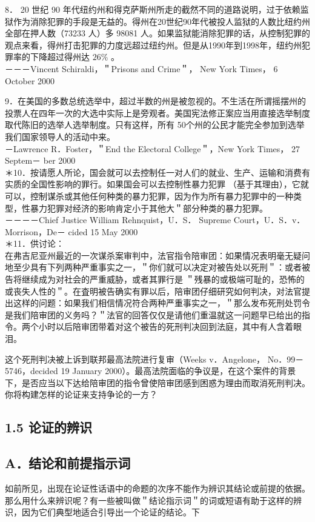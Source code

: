 8． 20 世纪 90 年代纽约州和得克萨斯州所走的截然不同的道路说明，过于依赖监狱作为消除犯罪的手段是无益的。得州在20世纪90年代被投人监狱的人数比纽约州全部在押人数（73233 人）多 98081 人。如果监狱能消除犯罪的话，从控制犯罪的观点来看，得州打击犯罪的力度远超过纽约州。但是从1990年到1998年，纽约州犯罪率的下降超过得州达 $26 \%$ 。\\
－－－Vincent Schiraldi，＂Prisons and Crime＂， New York Times， 6 October 2000

9．在美国的多数总统选举中，超过半数的州是被忽视的。不生活在所谓摇摆州的投票人在四年一次的大选中实际上是旁观者。美国宪法修正案应当用直接选举制度取代陈旧的选举人选举制度。只有这样，所有 50个州的公民才能完全参加到选举我们国家领导人的活动中来。\\
－Lawrence R．Foster，＂End the Electoral College＂，New York Times， 27 Septem－ ber 2000\\
＊10．按请愿人所论，国会就可以去控制任一对人们的就业、生产、运输和消费有实质的全国性影响的罪行。如果国会可以去控制性暴力犯罪 （基于其理由），它就可以，控制谋杀或其他任何种类的暴力犯罪，因为作为所有暴力犯罪中的一种类型，性暴力犯罪对经济的影响肯定小于其他大＂部分种类的暴力犯罪。\\
－－－－Chief Justice William Rehnquist，U．S． Supreme Court，U．S．v．Morrison，De－ cided 15 May 2000\\
＊11．供讨论：\\
在弗吉尼亚州最近的一次谋杀案审判中，法官指令陪审团：如果情况表明毫无疑问地至少具有下列两种严重事实之一，＂你们就可以决定对被告处以死刑＂：或者被告将继续成为对社会的严重威胁，或者其罪行是 ＂残暴的或极端可耻的，恐怖的或丧失人性的＂。在査明被告确实有罪以后，陪审团仔细研究如何判决，对法官提出这样的问题：如果我们相信情况符合两种严重事实之一，＂那么发布死刑处罚令是我们陪审团的义务吗？＂法官的回答仅仅是请他们重温就这一问题早已给出的指令。两个小时以后陪审团带着对这个被告的死刑判决回到法庭，其中有人含着眼泪。

这个死刑判决被上诉到联邦最高法院进行复审（Weeks v．Angelone， No．99－5746，decided 19 January 2000）。最高法院面临的争议是，在这个案件的背景下，是否应当以下达给陪审团的指令曾使陪审团感到困惑为理由而取消死刑判决。你将构建怎样的论证来支持争论的一方？

\subsection{1.5 论证的辨识}
\subsection{A．结论和前提指示词}
如前所见，出现在论证性话语中的命题的次序不能作为辨识其结论或前提的依据。那么用什么来辨识呢？有一些被叫做＂结论指示词＂的词或短语有助于这样的辨识，因为它们典型地适合引导出一个论证的结论。下

